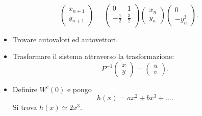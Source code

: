 \begin{ex}[]
    \[
        \begin{pmatrix} x_{n+1} \\ y_{n+1} \end{pmatrix}=
\begin{pmatrix}
    0 & 1 \\
    -\frac{1}{2} & \frac{3}{2} \\
\end{pmatrix}
    \begin{pmatrix} x_n \\ y_n \end{pmatrix}
    \begin{pmatrix} 0 \\ -y_n^3 \end{pmatrix}
    .\] 
    \begin{itemize}
        \item Trovare autovalori ed autovettori.
	\item Trasformare il sistema attraverso la trasformazione:
	    \[
	        P^{-1}\begin{pmatrix} x \\ y \end{pmatrix} = \begin{pmatrix} u \\ v \end{pmatrix}
	    .\] 
	\item Definire $W^c(0)$ e pongo
	    \[
		h(x) = ax^2+bx^3 + \ldots
	    .\] 
	    Si trova $h(x) \simeq 2x^3$.
    \end{itemize}
\end{ex}
\noindent
